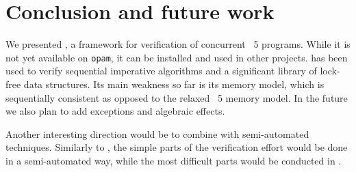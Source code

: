 \section{Conclusion and future work}

We presented \Zoo, a framework for verification of concurrent \OCaml~5 programs.
While it is not yet available on \texttt{opam}, it can be installed and used in other \Rocq projects.
%
\Zoo has been used to verify sequential imperative algorithms and a significant library of lock-free data structures.
Its main weakness so far is its memory model, which is sequentially consistent as opposed to the relaxed \OCaml~5 memory model.
In the future we also plan to add exceptions and algebraic effects.

Another interesting direction would be to combine \Zoo with semi-automated techniques.
Similarly to \WhyThree, the simple parts of the verification effort would be done in a semi-automated way, while the most difficult parts would be conducted in \Rocq.

